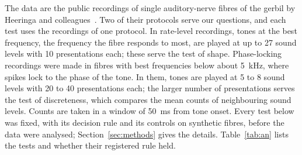 \documentclass[10pt,letterpaper]{article}
\begin{document}
The data are the public recordings of single auditory-nerve fibres of the gerbil by Heeringa and colleagues~\cite{Heeringa2024}.
Two of their protocols serve our questions, and each test uses the recordings of one protocol. In rate-level recordings, tones at the
best frequency, the frequency the fibre responds to most, are played at up to 27 sound levels with 10 presentations each; these serve
the test of shape. Phase-locking recordings were made in fibres with best frequencies below about 5~kHz, where spikes lock to the phase
of the tone. In them, tones are played at 5 to 8 sound levels with 20 to 40 presentations each; the larger number of presentations serves the
test of discreteness, which compares the mean counts of neighbouring sound levels. Counts are taken in a window of 50~ms from tone onset.
Every test below was fixed, with its decision rule and its controls on synthetic fibres, before the data were analysed;
Section~\ref{sec:methods} gives the details. Table~\ref{tab:an} lists the tests and whether their registered rule held.
\end{document}
